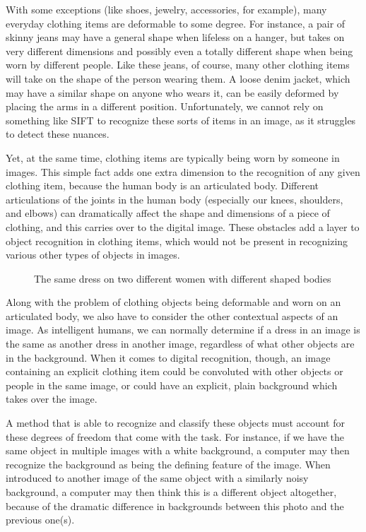 \documentclass[12pt]{article} %
\begin{document}
	With some exceptions (like shoes, jewelry, accessories, for example), many everyday clothing items are deformable to some degree. For instance, a pair of skinny jeans may have a general shape when lifeless on a hanger, but takes on very different dimensions and possibly even a totally different shape when being worn by different people. Like these jeans, of course, many other clothing items will take on the shape of the person wearing them. A loose denim jacket, which may have a similar shape on anyone who wears it, can be easily deformed by placing the arms in a different position. Unfortunately, we cannot rely on something like SIFT\cite{lowe1999object} to recognize these sorts of items in an image, as it struggles to detect these nuances. 

Yet, at the same time, clothing items are typically being worn by someone in images. This simple fact adds one extra dimension to the recognition of any given clothing item, because the human body is an articulated body. Different articulations of the joints in the human body (especially our knees, shoulders, and elbows) can dramatically affect the shape and dimensions of a piece of clothing, and this carries over to the digital image. These obstacles add a layer to object recognition in clothing items, which would not be present in recognizing various other types of objects in images.

\begin{figure}[h]
\caption{The same dress on two different women with different shaped bodies}\label{fig: 2}
\end{figure}

	Along with the problem of clothing objects being deformable and worn on an articulated body, we also have to consider the other contextual aspects of an image. As intelligent humans, we can normally determine if a dress in an image is the same as another dress in another image, regardless of what other objects are in the background. When it comes to digital recognition, though, an image containing an explicit clothing item could be convoluted with other objects or people in the same image, or could have an explicit, plain background which takes over the image.

A method that is able to recognize and classify these objects must account for these degrees of freedom that come with the task. For instance, if we have the same object in multiple images with a white background, a computer may then recognize the background as being the defining feature of the image. When introduced to another image of the same object with a similarly noisy background, a computer may then think this is a different object altogether, because of the dramatic difference in backgrounds between this photo and the previous one(s). 
	
\end{document}
